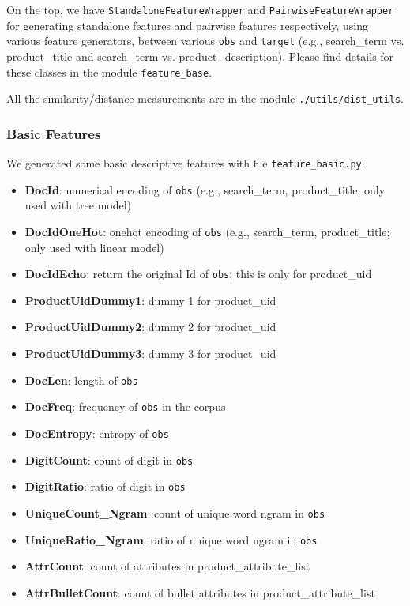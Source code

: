 \documentclass[12pt]{article}
\begin{document}
{{On the top, we have \texttt{StandaloneFeatureWrapper} and \texttt{PairwiseFeatureWrapper} for generating standalone features and pairwise features respectively, using various feature generators, between various \texttt{obs} and \texttt{target} (e.g., search\_term vs. product\_title and search\_term vs. product\_description). Please find details for these classes in the module \texttt{feature\_base}.

All the similarity/distance measurements are in the module \texttt{./utils/dist\_utils}.

\subsubsection{Basic Features}
\label{subsec:Basic_Features}
We generated some basic descriptive features with file \texttt{feature\_basic.py}.
\begin{itemize}
\item \textbf{DocId}: numerical encoding of \texttt{obs} (e.g., search\_term, product\_title; only used with tree model)
\item \textbf{DocIdOneHot}: onehot encoding of \texttt{obs} (e.g., search\_term, product\_title; only used with linear model)
\item \textbf{DocIdEcho}: return the original Id of \texttt{obs}; this is only for product\_uid
\item \textbf{ProductUidDummy1}: dummy 1 for product\_uid
\item \textbf{ProductUidDummy2}: dummy 2 for product\_uid
\item \textbf{ProductUidDummy3}: dummy 3 for product\_uid
\item \textbf{DocLen}: length of \texttt{obs}
\item \textbf{DocFreq}: frequency of \texttt{obs} in the corpus
\item \textbf{DocEntropy}: entropy of \texttt{obs}
\item \textbf{DigitCount}: count of digit in \texttt{obs}
\item \textbf{DigitRatio}: ratio of digit in \texttt{obs}
\item \textbf{UniqueCount\_Ngram}: count of unique word ngram in \texttt{obs}
\item \textbf{UniqueRatio\_Ngram}: ratio of unique word ngram in \texttt{obs}
\item \textbf{AttrCount}: count of attributes in product\_attribute\_list
\item \textbf{AttrBulletCount}: count of bullet attributes in product\_attribute\_list

\end{itemize}}}
\end{document}

